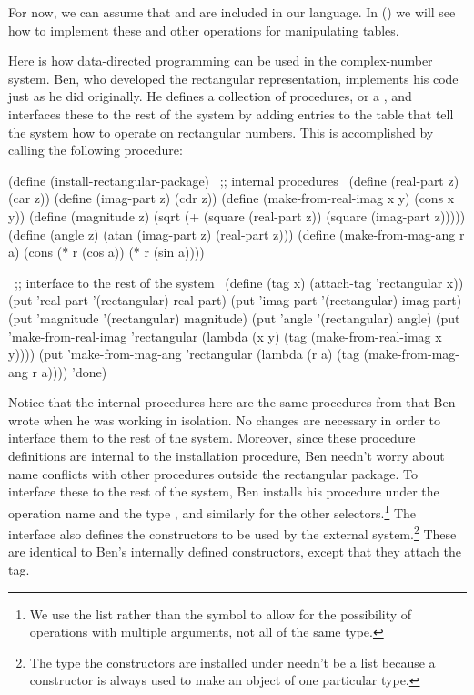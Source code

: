 \noindent
For now, we can assume that  and  are included in our
language.  In  () we
will see how to implement these and other operations for manipulating tables.

Here is how data-directed programming can be used in the complex-number system.
Ben, who developed the rectangular representation, implements his code just as
he did originally.  He defines a collection of procedures, or a
, and interfaces these to the rest of the system by adding
entries to the table that tell the system how to operate on rectangular
numbers.  This is accomplished by calling the following procedure:

\begin{codeBlock}
(define (install-rectangular-package)
  ~\textrm{;; internal procedures}~
  (define (real-part z) (car z))
  (define (imag-part z) (cdr z))
  (define (make-from-real-imag x y) (cons x y))
  (define (magnitude z)
    (sqrt (+ (square (real-part z))
             (square (imag-part z)))))
  (define (angle z)
    (atan (imag-part z) (real-part z)))
  (define (make-from-mag-ang r a)
    (cons (* r (cos a)) (* r (sin a))))

  ~\textrm{;; interface to the rest of the system}~
  (define (tag x) (attach-tag 'rectangular x))
  (put 'real-part '(rectangular) real-part)
  (put 'imag-part '(rectangular) imag-part)
  (put 'magnitude '(rectangular) magnitude)
  (put 'angle '(rectangular) angle)
  (put 'make-from-real-imag 'rectangular
       (lambda (x y) (tag (make-from-real-imag x y))))
  (put 'make-from-mag-ang 'rectangular
       (lambda (r a) (tag (make-from-mag-ang r a))))
  'done)
\end{codeBlock}

\noindent
Notice that the internal procedures here are the same procedures from
 that Ben wrote when he was working in isolation.  No changes are
necessary in order to interface them to the rest of the system.  Moreover,
since these procedure definitions are internal to the installation procedure,
Ben needn't worry about name conflicts with other procedures outside the
rectangular package.  To interface these to the rest of the system, Ben
installs his  procedure under the operation name
 and the type , and similarly for the other
selectors.\footnote{We use the list  rather than the symbol
 to allow for the possibility of operations with multiple
arguments, not all of the same type.}  The interface also defines the
constructors to be used by the external system.\footnote{The type the
constructors are installed under needn't be a list because a constructor is
always used to make an object of one particular type.}  These are identical to
Ben's internally defined constructors, except that they attach the tag.

